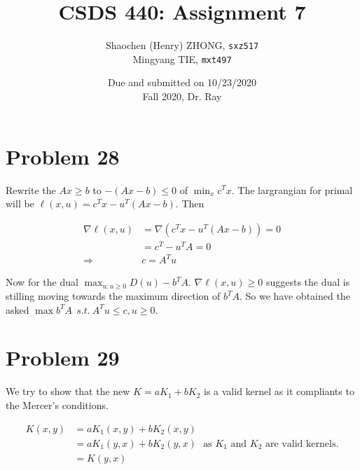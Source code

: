 \documentclass[12pt]{article}
\newcommand{\ilcode}{\texttt}
\begin{document}
\title{\textbf{CSDS 440: Assignment 7}}

\author{Shaochen (Henry) ZHONG, \ilcode{sxz517} \\ Mingyang TIE, \ilcode{mxt497}}
\date{Due and submitted on 10/23/2020 \\ Fall 2020, Dr. Ray}
\maketitle


\section{Problem 28}


Rewrite the $Ax \geq b$ to $-(Ax - b) \leq 0$ of $\min_x c^T x$. The largrangian for primal will be $\ell(x, u) = c^Tx - u^T (Ax - b)$. Then

\begin{align*}
    \nabla \ell(x, u) &= \nabla (c^Tx - u^T (Ax - b)) = 0\\
    &= c^T - u^TA  = 0 \\
    \Longrightarrow& c = A^T u
\end{align*}

Now for the dual $\max_{u: u \geq 0} D(u) - b^T A$. $\nabla \ell(x, u) \geq 0$ suggests the dual is stilling moving towards the maximum direction of $ b^T A$. So we have obtained the asked $\max b^T A \ \ s.t. \  A^T u \leq c, u \geq 0$.







\section{Problem 29}

We try to show that the new $K = aK_1 + bK_2$ is a valid kernel as it compliants to the Mercer's conditions.

\begin{align*}
    K(x, y) &= aK_1(x, y) + bK_2(x, y) \\
    &= aK_1(y, x) + bK_2(y, x) \ \ \ \text{as $K_1$ and $K_2$ are valid kernels.} \\
    &= K(y, x)
\end{align*}
\end{document}
